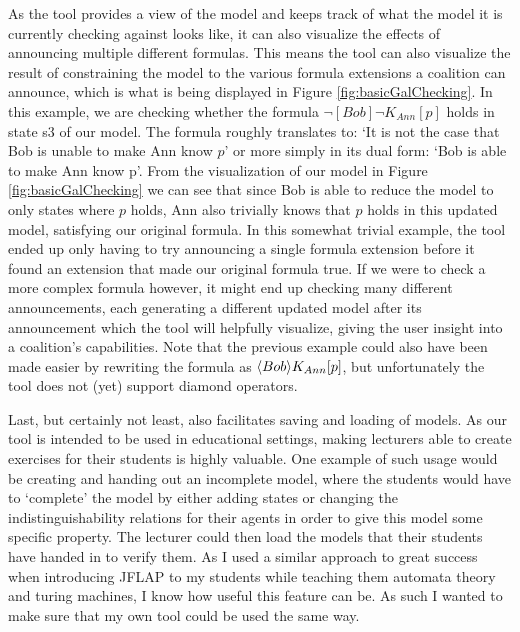 As the tool provides a view of the model and keeps track of what the model it is currently checking against looks like, it can also visualize the effects of announcing multiple different formulas. This means the tool can also visualize the result of constraining the model to the various formula extensions a coalition can announce, which is what is being displayed in Figure \ref{fig:basicGalChecking}. In this example, we are checking whether the formula $\neg [Bob]\neg K_{Ann}[p]$ holds in state s3 of our model. The formula roughly translates to: `It is not the case that Bob is unable to make Ann know $p$' or more simply in its dual form: `Bob is able to make Ann know p'. From the visualization of our model in Figure \ref{fig:basicGalChecking} we can see that since Bob is able to reduce the model to only states where $p$ holds, Ann also trivially knows that $p$ holds in this updated model, satisfying our original formula. In this somewhat trivial example, the tool ended up only having to try announcing a single formula extension before it found an extension that made our original formula true. If we were to check a more complex formula however, it might end up checking many different announcements, each generating a different updated model after its announcement which the tool will helpfully visualize, giving the user insight into a coalition's capabilities. Note that the previous example could also have been made easier by rewriting the formula as $\langle Bob\rangle K_{Ann}[p]$, but unfortunately the tool does not (yet) support diamond operators. 

Last, but certainly not least, \cname{} also facilitates saving and loading of models. As our tool is intended to be used in educational settings, making lecturers able to create exercises for their students is highly valuable. One example of such usage would be creating and handing out an incomplete model, where the students would have to `complete' the model by either adding states or changing the indistinguishability relations for their agents in order to give this model some specific property. The lecturer could then load the models that their students have handed in to verify them. As I used a similar approach to great success when introducing JFLAP to my students while teaching them automata theory and turing machines, I know how useful this feature can be. As such I wanted to make sure that my own tool could be used the same way.


